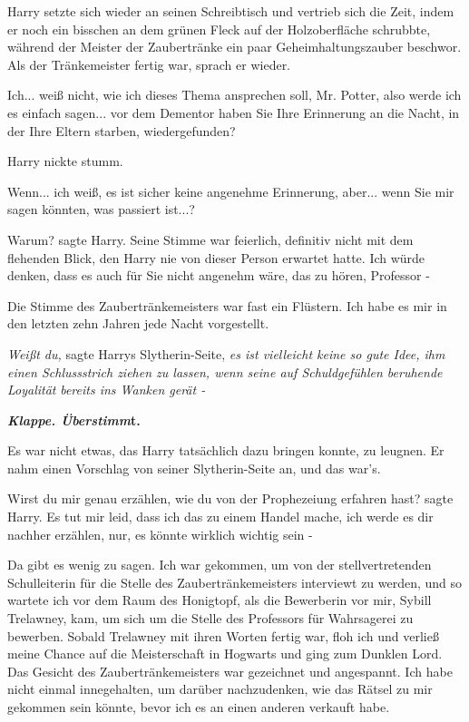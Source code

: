 Harry setzte sich wieder an seinen Schreibtisch und vertrieb sich die Zeit,
indem er noch ein bisschen an dem grünen Fleck auf der Holzoberfläche schrubbte,
während der Meister der Zaubertränke ein paar Geheimhaltungszauber beschwor. Als
der Tränkemeister fertig war, sprach er wieder.

\glqq Ich... weiß nicht, wie ich dieses Thema ansprechen soll, Mr. Potter, also
werde ich es einfach sagen... vor dem Dementor haben Sie Ihre Erinnerung an die
Nacht, in der Ihre Eltern starben, wiedergefunden?\grqq{}

Harry nickte stumm.

\glqq Wenn... ich weiß, es ist sicher keine angenehme Erinnerung, aber... wenn
Sie mir sagen könnten, was passiert ist...?\grqq{}

\glqq Warum?\grqq{} sagte Harry. Seine Stimme war feierlich, definitiv nicht mit
dem flehenden Blick, den Harry nie von dieser Person erwartet hatte. \glqq Ich
würde denken, dass es auch für Sie nicht angenehm wäre, das zu hören, Professor
-\grqq{}

Die Stimme des Zaubertränkemeisters war fast ein Flüstern. \glqq Ich habe es mir
in den letzten zehn Jahren jede Nacht vorgestellt.\grqq{}

\emph{Weißt du, }sagte Harrys Slytherin-Seite, \emph{es ist vielleicht keine so
gute Idee, ihm einen Schlussstrich ziehen zu lassen, wenn seine auf
Schuldgefühlen beruhende Loyalität }\emph{bereits ins Wanken gerät -}

\textbf{\emph{Klappe. Überstimm}}\textbf{t.}

Es war nicht etwas, das Harry tatsächlich dazu bringen konnte, zu leugnen. Er
nahm einen Vorschlag von seiner Slytherin-Seite an, und das war's.

\glqq Wirst du mir genau erzählen, wie du von der Prophezeiung erfahren
hast?\grqq{} sagte Harry. \glqq Es tut mir leid, dass ich das zu einem Handel
mache, ich werde es dir nachher erzählen, nur, es könnte wirklich wichtig sein
-\grqq{}

\glqq Da gibt es wenig zu sagen. Ich war gekommen, um von der stellvertretenden
Schulleiterin für die Stelle des Zaubertränkemeisters interviewt zu werden, und
so wartete ich vor dem Raum des Honigtopf, als die Bewerberin vor mir, Sybill
Trelawney, kam, um sich um die Stelle des Professors für Wahrsagerei zu
bewerben. Sobald Trelawney mit ihren Worten fertig war, floh ich und verließ
meine Chance auf die Meisterschaft in Hogwarts und ging zum Dunklen Lord.\grqq{}
Das Gesicht des Zaubertränkemeisters war gezeichnet und angespannt. \glqq Ich
habe nicht einmal innegehalten, um darüber nachzudenken, wie das Rätsel zu mir
gekommen sein könnte, bevor ich es an einen anderen verkauft habe.\grqq{}


